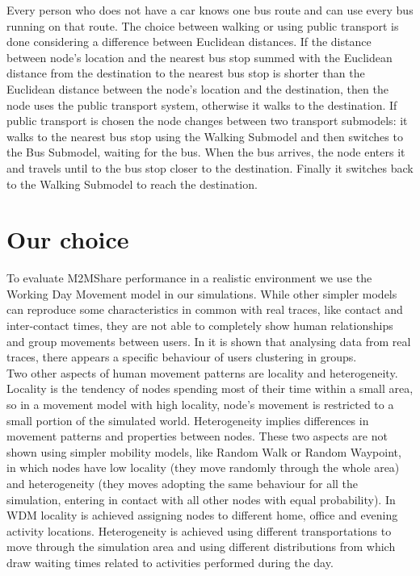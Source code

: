 Every person who does not have a car knows one bus route and can use every bus running on that route. The choice between walking or using public transport is done considering a difference between Euclidean distances. If the distance between node's location and the nearest bus stop summed with the Euclidean distance from the destination to the nearest bus stop is shorter than the Euclidean distance between the node's location and the destination, then the node uses the public transport system, otherwise it walks to the destination. If public transport is chosen the node changes between two transport submodels: it walks to the nearest bus stop using the Walking Submodel and then switches to the Bus Submodel, waiting for the bus. When the bus arrives, the node enters it and travels until to the bus stop closer to the destination. Finally it switches back to the Walking Submodel to reach the destination.
 
 
\section{Our choice}
To evaluate M2MShare performance in a realistic environment we use the Working Day Movement model in our simulations. While other simpler models can reproduce some characteristics in common with real traces, like contact and inter-contact times, they are not able to completely show human relationships and group movements between users. In \cite{Natarajan:2007:UUI:1762888.1762904} it is shown that analysing data from real traces, there appears a specific behaviour of users clustering in groups. 
\\

Two other aspects of human movement patterns are locality and heterogeneity. Locality is the tendency of nodes spending most of their time within a small area, so in a movement model with high locality, node's movement is restricted to a small portion of the simulated world. Heterogeneity implies differences in movement patterns and properties between nodes. These two aspects are not shown using simpler mobility models, like Random Walk or Random Waypoint, in which nodes have low locality (they move randomly through the whole area) and heterogeneity (they moves adopting the same behaviour for all the simulation, entering in contact with all other nodes with equal probability). In WDM locality is achieved assigning nodes to different home, office and evening activity locations. Heterogeneity is achieved using different transportations to move through the simulation area and using different distributions from which draw waiting times related to activities performed during the day.
\\

